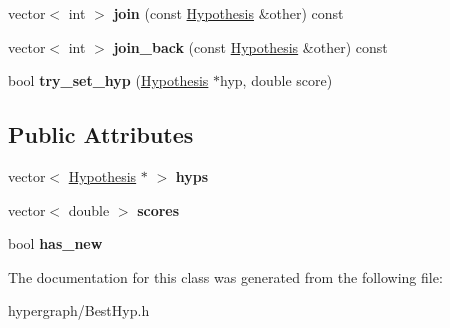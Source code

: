 \begin{DoxyCompactItemize}
\item 
\hypertarget{class_scarab_1_1_h_g_1_1_best_hyp_adb8421adc7af8cb8b4f5116599e807fd}{
vector$<$ int $>$ {\bfseries join} (const \hyperlink{struct_scarab_1_1_h_g_1_1_hypothesis}{Hypothesis} \&other) const }
\label{class_scarab_1_1_h_g_1_1_best_hyp_adb8421adc7af8cb8b4f5116599e807fd}

\item 
\hypertarget{class_scarab_1_1_h_g_1_1_best_hyp_ac9e2d1fc7e0d88865fa18d25877d63b8}{
vector$<$ int $>$ {\bfseries join\_\-back} (const \hyperlink{struct_scarab_1_1_h_g_1_1_hypothesis}{Hypothesis} \&other) const }
\label{class_scarab_1_1_h_g_1_1_best_hyp_ac9e2d1fc7e0d88865fa18d25877d63b8}

\item 
\hypertarget{class_scarab_1_1_h_g_1_1_best_hyp_ac079b15bdd5c65ede04d4e99eb683ff8}{
bool {\bfseries try\_\-set\_\-hyp} (\hyperlink{struct_scarab_1_1_h_g_1_1_hypothesis}{Hypothesis} $\ast$hyp, double score)}
\label{class_scarab_1_1_h_g_1_1_best_hyp_ac079b15bdd5c65ede04d4e99eb683ff8}

\end{DoxyCompactItemize}
\subsection*{Public Attributes}
\begin{DoxyCompactItemize}
\item 
\hypertarget{class_scarab_1_1_h_g_1_1_best_hyp_ab293f04d4d58e1503066c0d7b4e4013b}{
vector$<$ \hyperlink{struct_scarab_1_1_h_g_1_1_hypothesis}{Hypothesis} $\ast$ $>$ {\bfseries hyps}}
\label{class_scarab_1_1_h_g_1_1_best_hyp_ab293f04d4d58e1503066c0d7b4e4013b}

\item 
\hypertarget{class_scarab_1_1_h_g_1_1_best_hyp_a63d4d0feac5cff2ce7e00bdd15feb738}{
vector$<$ double $>$ {\bfseries scores}}
\label{class_scarab_1_1_h_g_1_1_best_hyp_a63d4d0feac5cff2ce7e00bdd15feb738}

\item 
\hypertarget{class_scarab_1_1_h_g_1_1_best_hyp_abf49848ebb40edc6cd7c30af8139f389}{
bool {\bfseries has\_\-new}}
\label{class_scarab_1_1_h_g_1_1_best_hyp_abf49848ebb40edc6cd7c30af8139f389}

\end{DoxyCompactItemize}


The documentation for this class was generated from the following file:\begin{DoxyCompactItemize}
\item 
hypergraph/BestHyp.h\end{DoxyCompactItemize}
